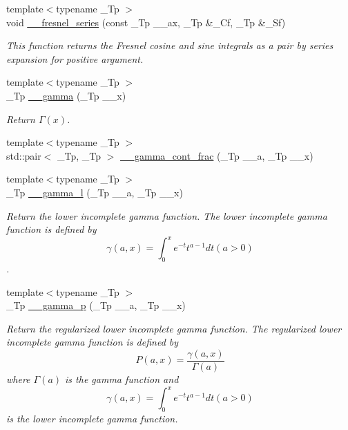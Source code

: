 \begin{DoxyCompactItemize}
{\footnotesize template$<$typename \+\_\+\+Tp $>$ }\\void \hyperlink{namespacestd_1_1____detail_aae7775bc46d621e54fb9d994c2f35e2a}{\+\_\+\+\_\+fresnel\+\_\+series} (const \+\_\+\+Tp \+\_\+\+\_\+ax, \+\_\+\+Tp \&\+\_\+\+Cf, \+\_\+\+Tp \&\+\_\+\+Sf)
\begin{DoxyCompactList}\small\item\em This function returns the Fresnel cosine and sine integrals as a pair by series expansion for positive argument. \end{DoxyCompactList}\item 
{\footnotesize template$<$typename \+\_\+\+Tp $>$ }\\\+\_\+\+Tp \hyperlink{namespacestd_1_1____detail_aa0e76080654c918631595a7da642913f}{\+\_\+\+\_\+gamma} (\+\_\+\+Tp \+\_\+\+\_\+x)
\begin{DoxyCompactList}\small\item\em Return $ \Gamma(x) $. \end{DoxyCompactList}\item 
{\footnotesize template$<$typename \+\_\+\+Tp $>$ }\\std\+::pair$<$ \+\_\+\+Tp, \+\_\+\+Tp $>$ \hyperlink{namespacestd_1_1____detail_afd6319747af991947a02388acee40c26}{\+\_\+\+\_\+gamma\+\_\+cont\+\_\+frac} (\+\_\+\+Tp \+\_\+\+\_\+a, \+\_\+\+Tp \+\_\+\+\_\+x)
\item 
{\footnotesize template$<$typename \+\_\+\+Tp $>$ }\\\+\_\+\+Tp \hyperlink{namespacestd_1_1____detail_a18fe1f8c781d5964d28e9525127e4fdb}{\+\_\+\+\_\+gamma\+\_\+l} (\+\_\+\+Tp \+\_\+\+\_\+a, \+\_\+\+Tp \+\_\+\+\_\+x)
\begin{DoxyCompactList}\small\item\em Return the lower incomplete gamma function. The lower incomplete gamma function is defined by \[ \gamma(a,x) = \int_0^x e^{-t}t^{a-1}dt (a > 0) \]. \end{DoxyCompactList}\item 
{\footnotesize template$<$typename \+\_\+\+Tp $>$ }\\\+\_\+\+Tp \hyperlink{namespacestd_1_1____detail_a4583981bd73c3d3bba970c2f91dc4ba5}{\+\_\+\+\_\+gamma\+\_\+p} (\+\_\+\+Tp \+\_\+\+\_\+a, \+\_\+\+Tp \+\_\+\+\_\+x)
\begin{DoxyCompactList}\small\item\em Return the regularized lower incomplete gamma function. The regularized lower incomplete gamma function is defined by \[ P(a,x) = \frac{\gamma(a,x)}{\Gamma(a)} \] where $ \Gamma(a) $ is the gamma function and \[ \gamma(a,x) = \int_0^x e^{-t}t^{a-1}dt (a > 0) \] is the lower incomplete gamma function. \end{DoxyCompactList}\item 

\end{DoxyCompactItemize}
